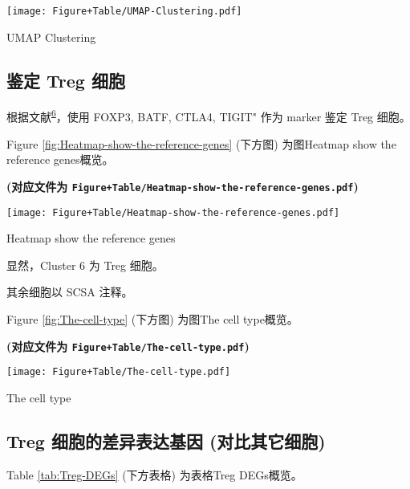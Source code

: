 \documentclass[
]{article}
\begin{document}
\def\@captype{figure}
\begin{center}
\texttt{[image: Figure+Table/UMAP-Clustering.pdf]}
\caption{UMAP Clustering}\label{fig:UMAP-Clustering}
\end{center}

\hypertarget{ux9274ux5b9a-treg-ux7ec6ux80de}{%
\subsection{鉴定 Treg 细胞}\label{ux9274ux5b9a-treg-ux7ec6ux80de}}

根据文献\textsuperscript{\protect\hyperlink{ref-SingleCellSeqKrishn2021}{6}}，使用 FOXP3, BATF, CTLA4, TIGIT" 作为 marker 鉴定 Treg 细胞。

Figure \ref{fig:Heatmap-show-the-reference-genes} (下方图) 为图Heatmap show the reference genes概览。

\textbf{(对应文件为 \texttt{Figure+Table/Heatmap-show-the-reference-genes.pdf})}

\def\@captype{figure}
\begin{center}
\texttt{[image: Figure+Table/Heatmap-show-the-reference-genes.pdf]}
\caption{Heatmap show the reference genes}\label{fig:Heatmap-show-the-reference-genes}
\end{center}

显然，Cluster 6 为 Treg 细胞。

其余细胞以 SCSA 注释。

Figure \ref{fig:The-cell-type} (下方图) 为图The cell type概览。

\textbf{(对应文件为 \texttt{Figure+Table/The-cell-type.pdf})}

\def\@captype{figure}
\begin{center}
\texttt{[image: Figure+Table/The-cell-type.pdf]}
\caption{The cell type}\label{fig:The-cell-type}
\end{center}

\hypertarget{treg-ux7ec6ux80deux7684ux5deeux5f02ux8868ux8fbeux57faux56e0-ux5bf9ux6bd4ux5176ux5b83ux7ec6ux80de}{%
\subsection{Treg 细胞的差异表达基因 (对比其它细胞)}\label{treg-ux7ec6ux80deux7684ux5deeux5f02ux8868ux8fbeux57faux56e0-ux5bf9ux6bd4ux5176ux5b83ux7ec6ux80de}}

Table \ref{tab:Treg-DEGs} (下方表格) 为表格Treg DEGs概览。
\end{document}
